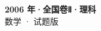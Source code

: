 \documentclass[zihao=-4, a4paper]{ctexart}
\begin{document}
\begin{center}
  {\Large\bfseries 2006 年·全国卷Ⅱ·理科}\\[4pt]
  {\large 数学 · 试题版}
\end{center}
\medskip
{}

\end{document}
